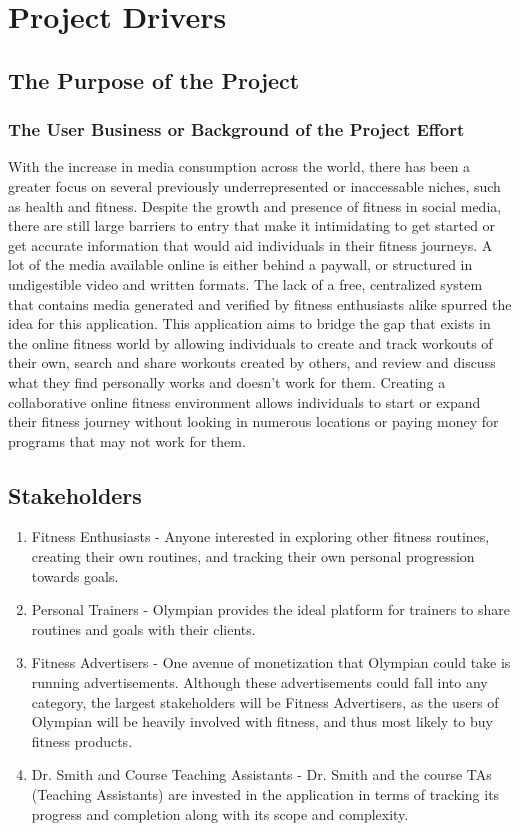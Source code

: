 \documentclass[12pt]{article}
\begin{document}
\section{Project Drivers}
\subsection{The Purpose of the Project}
  \subsubsection{The User Business or Background of the Project Effort}
  \noindent
  With the increase in media consumption across the world, there has been a greater focus on several previously underrepresented or inaccessable niches, such as health and fitness. Despite the growth and presence of fitness in social media, there are still large barriers to entry that make it intimidating to get started or get accurate information that would aid individuals in their fitness journeys. A lot of the media available online is either behind a paywall, or structured in undigestible video and written formats. The lack of a free, centralized system that contains media generated and verified by fitness enthusiasts alike spurred the idea for this application. This application aims to bridge the gap that exists in the online fitness world by allowing individuals to create and track workouts of their own, search and share workouts created by others, and review and discuss what they find personally works and doesn't work for them. Creating a collaborative online fitness environment allows individuals to start or expand their fitness journey without looking in numerous locations or paying money for programs that may not work for them. 
\subsection{Stakeholders}
\begin{enumerate}
	\item Fitness Enthusiasts - Anyone interested in exploring other fitness routines, creating their own routines, and tracking their own personal progression towards goals.
	\item Personal Trainers - Olympian provides the ideal platform for trainers to share routines and goals with their clients.
	\item Fitness Advertisers - One avenue of monetization that Olympian could take is running advertisements. Although these advertisements could fall into any category, the largest stakeholders will be Fitness Advertisers,
	as the users of Olympian will be heavily involved with fitness, and thus most likely to buy fitness products.
	\item Dr. Smith and Course Teaching Assistants - Dr. Smith and the course TAs (Teaching Assistants) are invested in the application in terms of tracking its progress and completion along with its scope and complexity.
\end{enumerate} 
\end{document}
